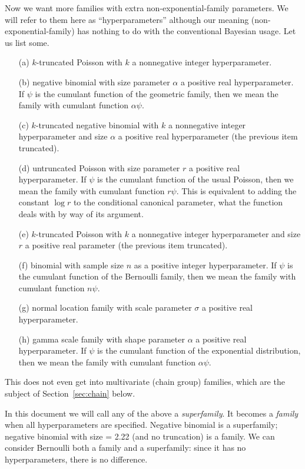 \documentclass[11pt]{article}
\begin{document}
Now we want more families with extra non-exponential-family parameters.
We will refer to them here as ``hyperparameters'' although our meaning
(non-exponential-family) has nothing to do with the conventional Bayesian
usage.  Let us list some.
\begin{enumerate}
\item[(a)] $k$-truncated Poisson with $k$ a nonnegative integer hyperparameter.
\item[(b)] negative binomial with size parameter $\alpha$ a positive real
    hyperparameter.
    If $\psi$ is the cumulant function of the geometric family, then we
    mean the family with cumulant function $\alpha \psi$.
\item[(c)] $k$-truncated negative binomial with $k$ a nonnegative integer
    hyperparameter and size $\alpha$ a positive real hyperparameter
    (the previous item truncated).
\item[(d)] untruncated Poisson with size parameter $r$ a positive real
    hyperparameter.
    If $\psi$ is the cumulant function of the usual Poisson, then we mean
    the family with cumulant function $r \psi$.  This is equivalent to
    adding the constant $\log r$ to the conditional canonical parameter,
    what the \verb@glm@ function deals with by way of its
    \verb@offset@ argument.
\item[(e)] $k$-truncated Poisson with $k$ a nonnegative integer hyperparameter
    and size $r$ a positive real parameter (the previous item truncated).
\item[(f)] binomial with sample size $n$ as a positive integer hyperparameter.
    If $\psi$ is the cumulant function of the Bernoulli family, then we
    mean the family with cumulant function $n \psi$.
\item[(g)] normal location family with scale parameter $\sigma$ a positive
    real hyperparameter.
\item[(h)] gamma scale family with shape parameter $\alpha$ a positive
    real hyperparameter.
    If $\psi$ is the cumulant function of the exponential distribution, then we
    mean the family with cumulant function $\alpha \psi$.
\end{enumerate}
This does not even get into multivariate (chain group) families, which
are the subject of Section~\ref{sec:chain} below.

\label{pg:super}
In this document we will call any of the above a \emph{superfamily}.
It becomes a \emph{family} when all hyperparameters are specified.
Negative binomial is a superfamily; negative binomial with size = 2.22
(and no truncation) is a family.  We can consider Bernoulli both a family
and a superfamily: since it has no hyperparameters, there is no difference.
\end{document}
